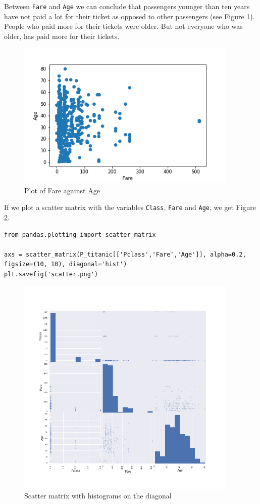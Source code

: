 \documentclass[11pt]{article}
\begin{document}
Between \texttt{Fare} and \texttt{Age} we can conclude that passengers younger than ten years have not paid a lot for their ticket as opposed to other passengers (see Figure \ref{tab:fareage}). People who paid more for their tickets were older. But not everyone who was older, has paid more for their tickets. 
\begin{figure}[htbp]
\centering
\includegraphics[width=400px]{./FareAge.png}
\caption{\label{tab:fareage}
Plot of Fare against Age}
\end{figure}


If we plot a scatter matrix with the variables \texttt{Class}, \texttt{Fare} and \texttt{Age}, we get Figure \ref{tab:scattermatrix}.   
\newpage
\begin{verbatim}
from pandas.plotting import scatter_matrix

axs = scatter_matrix(P_titanic[['Pclass','Fare','Age']], alpha=0.2, figsize=(10, 10), diagonal='hist')
plt.savefig('scatter.png')
\end{verbatim}

\begin{figure}[htbp]
\centering
\includegraphics[width=400px]{./scatter.png}
\caption{\label{tab:scattermatrix}
Scatter matrix with histograms on the diagonal}
\end{figure}
\end{document}
